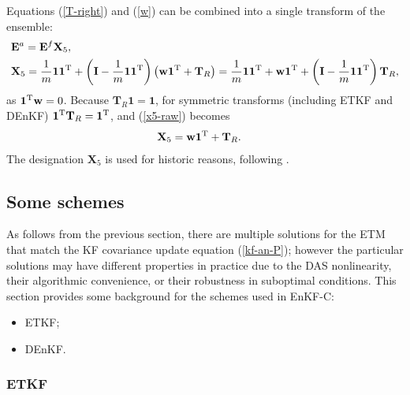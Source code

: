 \documentclass[11pt]{report}
\newcommand{\mb} {\mathbf}
\newcommand{\T}{^{\tiny \mathrm T}}
\begin{document}
Equations (\ref{T-right}) and (\ref{w}) can be combined into a single transform of the ensemble:
\begin{align}
  \label{x5-def}
  & \mb E^a = \mb E^f \mb X_5,\\
  \label{x5-raw}
  & \mb X_5 = \frac{1}{m} \mb 1 \mb 1\T + \left( \mb I - \frac{1}{m} \mb 1 \mb 1\T\right) \left( \mb w \mb 1\T + \mb T_R\right)
  = \frac{1}{m} \mb 1 \mb 1\T + \mb w \mb 1\T + \left( \mb I - \frac{1}{m} \mb 1 \mb 1\T \right) \mb T_R,
\end{align}
as $\mb 1\T \mb w = 0$. 
Because $\mb T_R \mb 1 = \mb 1$, for symmetric transforms (including ETKF and DEnKF) $\mb 1\T \mb T_R = \mb 1\T$, and (\ref{x5-raw}) becomes
\begin{align}
  \label{x5}
  & \mb X_5 = \mb w \mb 1\T + \mb T_R.
\end{align}
The designation $\mb X_5$ is used for historic reasons, following \citet{eve03a}.

\subsection{Some schemes}

As follows from the previous section, there are multiple solutions for the ETM that match the KF covariance update equation (\ref{kf-an-P}); however the particular solutions may have different properties in practice due to the DAS nonlinearity, their algorithmic convenience, or their robustness in suboptimal conditions.
This section provides some background for the schemes used in EnKF-C:
\begin{itemize}
\item ETKF;
\item DEnKF.
\end{itemize}

\subsubsection{ETKF}
\end{document}
